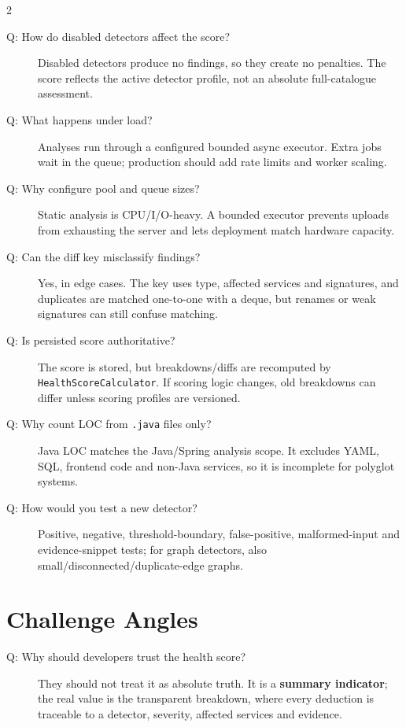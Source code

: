 \documentclass[10pt,a4paper]{article}
\begin{document}
\begin{multicols}{2}
\begin{description}
    \item[Q: How do disabled detectors affect the score?]
    Disabled detectors produce no findings, so they create no penalties. The score reflects the active detector profile, not an absolute full-catalogue assessment.

    \item[Q: What happens under load?]
    Analyses run through a configured bounded async executor. Extra jobs wait in the queue; production should add rate limits and worker scaling.

    \item[Q: Why configure pool and queue sizes?]
    Static analysis is CPU/I/O-heavy. A bounded executor prevents uploads from exhausting the server and lets deployment match hardware capacity.

    \item[Q: Can the diff key misclassify findings?]
    Yes, in edge cases. The key uses type, affected services and signatures, and duplicates are matched one-to-one with a deque, but renames or weak signatures can still confuse matching.

    \item[Q: Is persisted score authoritative?]
    The score is stored, but breakdowns/diffs are recomputed by \texttt{HealthScoreCalculator}. If scoring logic changes, old breakdowns can differ unless scoring profiles are versioned.

    \item[Q: Why count LOC from \texttt{.java} files only?]
    Java LOC matches the Java/Spring analysis scope. It excludes YAML, SQL, frontend code and non-Java services, so it is incomplete for polyglot systems.

    \item[Q: How would you test a new detector?]
    Positive, negative, threshold-boundary, false-positive, malformed-input and evidence-snippet tests; for graph detectors, also small/disconnected/duplicate-edge graphs.
\end{description}

\section{Challenge Angles}

\begin{description}
    \item[Q: Why should developers trust the health score?]
    They should not treat it as absolute truth. It is a \textbf{summary indicator}; the real value is the transparent breakdown, where every deduction is traceable to a detector, severity, affected services and evidence.


\end{description}
\end{multicols}
\end{document}

